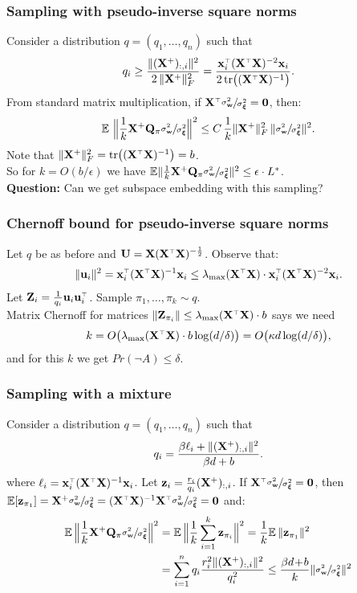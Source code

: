 \documentclass{beamer}
\begin{document}
\begin{frame}
  \frametitle{Sampling with pseudo-inverse square norms}
  Consider a distribution $q=(q_1,\dots,q_n)$ such that
  \begin{align*}
    q_i \geq \frac{\|(\X^+)_{:,i}\|^2}{2\,\|\X^+\|_F^2} =
    \frac{\x_i^\top(\X^\top\X)^{-2}\x_i}{2\,\tr\big((\X^\top\X)^{-1}\big)}.
  \end{align*}
  From standard matrix multiplication, if $\X^\top\r = \zero$, then:
  \begin{align*}
    \mathbb E\  \Big\|\frac1k\mathbf X^+\mathbf Q_\pi \sfrac{\sigma_{\mathbf w}^2}{\sigma_{\boldsymbol\xi}^2}\Big\|^2 \leq
    C\,\frac1k \|\mathbf X^+\|_F^2\,\|\sfrac{\sigma_{\mathbf w}^2}{\sigma_{\boldsymbol\xi}^2}\|^2.
  \end{align*}
  Note that $\|\X^+\|_F^2=\tr\big((\X^\top\X)^{-1}\big)=b$. \\
  So for $k=O(b/\epsilon)$ we have $\mathbb E\|\frac1k\mathbf X^+\mathbf Q_\pi\sfrac{\sigma_{\mathbf w}^2}{\sigma_{\boldsymbol\xi}^2}\|^2\leq
  \epsilon\cdot L^*$.\\[5mm]
  \textbf{Question:} Can we get subspace embedding with this sampling?
\end{frame}

\begin{frame}
  \frametitle{Chernoff bound for pseudo-inverse square norms}
Let $q$ be as before and $\U=\X(\X^\top\X)^{-\frac12}$.  Observe that:
  \begin{align*}
\|\u_i\|^2=\x_i^\top(\X^\top\X)^{-1}\x_i \leq
    \lambda_{\max}(\X^\top\X)\cdot \x_i^\top(\X^\top\X)^{-2}\x_i. 
  \end{align*}
  Let $\Z_i = \frac1{q_i}\u_i\u_i^\top$.
  Sample $\pi_1,\dots,\pi_k\sim q$.\\[1mm]
  Matrix Chernoff for matrices
  $\|\Z_{\pi_i}\|\leq \lambda_{\max}(\X^\top\X)\cdot b$ says we
  need
  \[k=O\big( \lambda_{\max}(\X^\top\X)\cdot b\log
    (d/\delta)\big)=O\big(\kappa d\log(d/\delta)\big),\]
  and for this $k$ we get $Pr(\neg A)\leq \delta$.
  \end{frame}

\begin{frame}
  \frametitle{Sampling with a mixture}
  Consider a distribution $q=(q_1,\dots,q_n)$ such that
  \begin{align*}
    q_i = \frac{\beta\ell_i+ \| (\mathbf X^+)_{:,i}\|^2}{\beta d +b}.
  \end{align*}
where $\ell_i=\x_i^\top(\X^\top\X)^{-1}\x_i$. Let $\mathbf z_i =
\frac{r_i}{q_i}(\mathbf X^+)_{:,i}$. If $\X^\top\r = \zero$, then
$\E[\z_{\pi_1}] = \X^+\r = (\X^\top\X)^{-1}\X^\top\r = \zero$ and:
  \begin{align*}
    \mathbb E\, \Big\|\frac1k\mathbf X^+\mathbf Q_\pi \sfrac{\sigma_{\mathbf w}^2}{\sigma_{\boldsymbol\xi}^2}\Big\|^2 &= \mathbb E\,\Big\|\frac1k
    \sum_{i=1}^k\mathbf z_{\pi_i}\Big\|^2 = \frac1k
    \mathbb E\,\|\mathbf z_{\pi_1}\|^2\\
    &=\sum_{i=1}^nq_i \frac{r_i^2 \| (\mathbf X^+)_{:,i}\|^2}{q_i^2}\leq
\frac{\beta d\!+\! b}{k}\|\sfrac{\sigma_{\mathbf w}^2}{\sigma_{\boldsymbol\xi}^2}\|^2
  \end{align*}
\end{frame}
\end{document}
